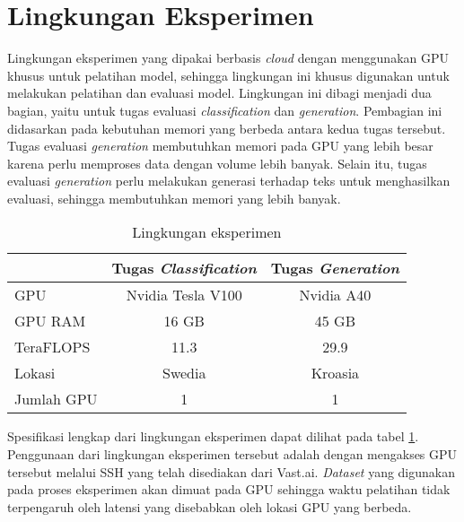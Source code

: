 \section{Lingkungan Eksperimen}
\label{sec:lingkungan-eksperimen}

Lingkungan eksperimen yang dipakai berbasis \textit{cloud} dengan menggunakan GPU khusus untuk pelatihan model, sehingga lingkungan ini khusus digunakan untuk melakukan pelatihan dan evaluasi model. Lingkungan ini dibagi menjadi dua bagian, yaitu untuk tugas evaluasi \textit{classification} dan \textit{generation}. Pembagian ini didasarkan pada kebutuhan memori yang berbeda antara kedua tugas tersebut. Tugas evaluasi \textit{generation} membutuhkan memori pada GPU yang lebih besar karena perlu memproses data dengan volume lebih banyak. Selain itu, tugas evaluasi \textit{generation} perlu melakukan generasi terhadap teks untuk menghasilkan evaluasi, sehingga membutuhkan memori yang lebih banyak.

\begin{table}[h]
    \vspace{0.25cm}
    \centering
    \caption{Lingkungan eksperimen}
    \label{table:lingkungan-eksperimen}
    \begin{tabular}{lcc}
        \toprule
        & \textbf{Tugas \textit{Classification}} & \textbf{Tugas \textit{Generation}} \\ 
        \midrule
        GPU          & Nvidia Tesla V100  & Nvidia A40       \\
        GPU RAM      & 16 GB              & 45 GB            \\
        TeraFLOPS    & 11.3               & 29.9             \\
        Lokasi       & Swedia             & Kroasia          \\
        Jumlah GPU   & 1                  & 1                \\
        \bottomrule
    \end{tabular}
\end{table}

Spesifikasi lengkap dari lingkungan eksperimen dapat dilihat pada tabel \ref{table:lingkungan-eksperimen}. Penggunaan dari lingkungan eksperimen tersebut adalah dengan mengakses GPU tersebut melalui SSH yang telah disediakan dari Vast.ai. \textit{Dataset} yang digunakan pada proses eksperimen akan dimuat pada GPU sehingga waktu pelatihan tidak terpengaruh oleh latensi yang disebabkan oleh lokasi GPU yang berbeda.

